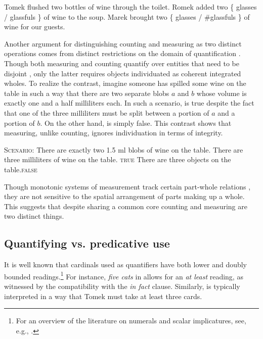 \documentclass[output=paper]{langscibook}
\begin{document}
\ea\label{ex:container} \ea Tomek flushed two bottles of wine through the toilet.\label{ex:container-ambiguity}
\ex Romek added two \{ glasses / glassfuls \} of wine to the soup.\label{ex:container-measure}
\ex Marek brought two \{ glasses / \#glassfuls \} of wine for our guests.\label{ex:container-counting}
\z
\z

\noindent Another argument for distinguishing counting and measuring as two distinct operations comes from distinct restrictions on the domain of quantification \citep{wagiel2018subatomic}. Though both measuring and counting quantify over entities that need to be disjoint \citep{landman2016iceberg}, only the latter requires objects individuated as coherent integrated wholes. To realize the contrast, imagine someone has spilled some wine on the table in such a way that there are two separate blobs $a$ and $b$ whose volume is exactly one and a half milliliters each. In such a scenario,  is true despite the fact that one of the three milliliters must be split between a portion of $a$ and a portion of $b$. On the other hand,  is simply false. This contrast shows that measuring, unlike counting, ignores individuation in terms of integrity.

\ea\label{ex:measuring-counting-integrity} \textsc{Scenario:} There are exactly two 1.5 ml blobs of wine on the table.
\ea There are three milliliters of wine on the table. \hfill \textsc{true}\label{ex:measuring-integrity}
\ex There are three objects on the table.\hfill \textsc{false}\label{ex:counting-integrity}
\z
\z

\noindent Though monotonic systems of measurement track certain part-whole relations \citep{schwarzschild2002grammar}, they are not sensitive to the spatial arrangement of parts making up a whole. This suggests that despite sharing a common core counting and measuring are two distinct things.

	\subsection{Quantifying vs. predicative use}\label{sec:quantifying-vs-predicative-use}

It is well known that cardinals used as quantifiers have both lower and doubly bounded readings.\footnote{For an overview of the literature on numerals and scalar implicatures, see, e.g., \citet{spector2013bare}.} For instance, \textit{five cats} in  allows for an \textit{at least} reading, as witnessed by the compatibility with the \textit{in fact} clause. Similarly,  is typically interpreted in a way that Tomek must take at least three cards.
\end{document}
